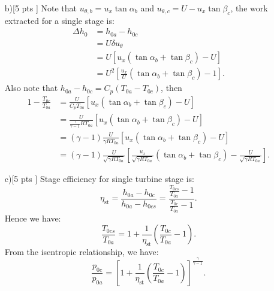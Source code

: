 \documentclass[12pt]{article}
\begin{document}
\begin{itemize}
	\item[b)[5 pts]]
	Note that $u_{\theta,b} = u_x \tan \alpha_b$ and $u_{\theta,c} = U - u_x \tan \beta_c$, the work extracted for a single stage is:
	\begin{align}
		\Delta h_0 &= h_{0a} - h_{0c} \nonumber \\
				   &= U\delta u_{\theta} \nonumber \\
				   &= U \left[ u_x \left(\tan \alpha_b + \tan \beta_c\right) - U\right] \nonumber \\
				   &= U^2 \left[ \frac{u_x}{U} \left(\tan \alpha_b + \tan \beta_c\right) - 1\right].
	\end{align}
	Also note that $h_{0a} - h_{0c} = C_p\left(T_{0a}-T_{0c}\right)$, then
	\begin{align}
		1 - \frac{T_{0c}}{T_{0a}} &= \frac{U}{C_p T_{0a}} \left[ u_x \left(\tan \alpha_b + \tan \beta_c\right) - U\right] \nonumber \\
								  &= \frac{U}{\frac{\gamma}{\gamma - 1}R T_{0a}} \left[ u_x \left(\tan \alpha_b + \tan \beta_c\right) - U\right] \nonumber \\
								  &= \left(\gamma - 1\right)\frac{U}{\gamma R T_{0a}} \left[ u_x \left(\tan \alpha_b + \tan \beta_c\right) - U\right] \nonumber \\
								  &= \left(\gamma - 1\right)\frac{U}{\sqrt{\gamma R T_{0a}}} \left[ \frac{u_x}{\sqrt{\gamma R T_{0a}}} \left(\tan \alpha_b + \tan \beta_c\right) - \frac{U}{\sqrt{\gamma R T_{0a}}}\right].
	\end{align}
	
	\item[c)[5 pts]]
	Stage efficiency for single turbine stage is:
	\begin{equation}
		\eta_\text{st} = \frac{h_{0a} - h_{0c}}{h_{0a} - h_{0cs}} = \frac{\frac{T_{0cs}}{T_{0a}}-1}{\frac{T_{0c}}{T_{0a}}-1}.
	\end{equation}
	Hence we have:
	\begin{equation}
		\frac{T_{0cs}}{T_{0a}} = 1 + \frac{1}{\eta_\text{st}}\left( \frac{T_{0c}}{T_{0a}}-1\right).
	\end{equation}
	From the isentropic relationship, we have:
	\begin{equation}
		\frac{p_{0c}}{p_{0a}} = \left[1 + \frac{1}{\eta_\text{st}}\left( \frac{T_{0c}}{T_{0a}}-1\right)\right]^{\frac{\gamma}{\gamma - 1}}.
	\end{equation}
	

\end{itemize}
\end{document}
